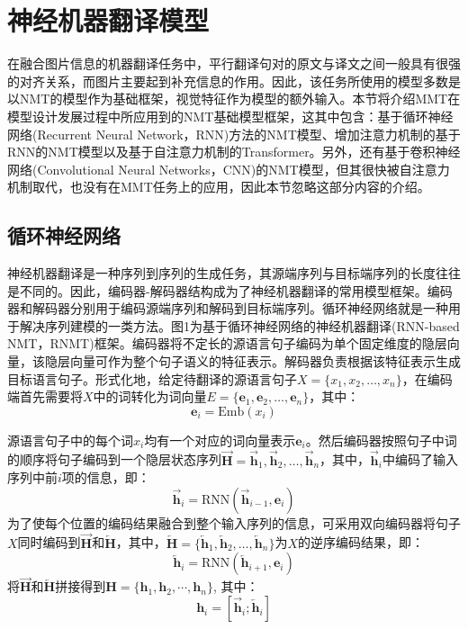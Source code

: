 \section{神经机器翻译模型}
在融合图片信息的机器翻译任务中，平行翻译句对的原文与译文之间一般具有很强的对齐关系，而图片主要起到补充信息的作用。因此，该任务所使用的模型多数是以NMT的模型作为基础框架，视觉特征作为模型的额外输入。本节将介绍MMT在模型设计发展过程中所应用到的NMT基础模型框架，这其中包含：基于循环神经网络(Recurrent Neural Network，RNN)方法的NMT模型、增加注意力机制的基于RNN的NMT模型以及基于自注意力机制的Transformer。另外，还有基于卷积神经网络(Convolutional Neural Networks，CNN)的NMT模型\cite{6_DBLP:journals/corr/GehringAGYD17}，但其很快被自注意力机制取代，也没有在MMT任务上的应用，因此本节忽略这部分内容的介绍。

\subsection{循环神经网络}
神经机器翻译是一种序列到序列的生成任务，其源端序列与目标端序列的长度往往是不同的。因此，编码器-解码器结构成为了神经机器翻译的常用模型框架。编码器和解码器分别用于编码源端序列和解码到目标端序列。循环神经网络就是一种用于解决序列建模的一类方法。图1为基于循环神经网络的神经机器翻译(RNN-based NMT，RNMT)框架。编码器将不定长的源语言句子编码为单个固定维度的隐层向量，该隐层向量可作为整个句子语义的特征表示。解码器负责根据该特征表示生成目标语言句子。形式化地，给定待翻译的源语言句子$X=\{x_1,x_2,…,x_n\}$，在编码端首先需要将$X$中的词转化为词向量$E=\{\boldsymbol{e}_1,\boldsymbol{e}_2,…,\boldsymbol{e}_n\}$，其中：
\begin{equation}
    \boldsymbol{e}_i=\mathrm{Emb}(x_i)
\end{equation}

源语言句子中的每个词$x_i$均有一个对应的词向量表示$\boldsymbol{e}_i$。然后编码器按照句子中词的顺序将句子编码到一个隐层状态序列$\overrightarrow{\boldsymbol{H}}={\overrightarrow{\boldsymbol{h}}_1,\overrightarrow{\boldsymbol{h}}_2,…,\overrightarrow{\boldsymbol{h}}_n}$，其中，$\overrightarrow{\boldsymbol{h}}_i$中编码了输入序列中前$i$项的信息，即：
\begin{equation}
    \overrightarrow{\boldsymbol{h}}_i=\mathrm{RNN}(\overrightarrow{\boldsymbol{h}}_{i-1},\boldsymbol{e}_i)
\end{equation}
为了使每个位置的编码结果融合到整个输入序列的信息，可采用双向编码器将句子$X$同时编码到$\overrightarrow{\boldsymbol{H}}$和$\overleftarrow{\boldsymbol{H}}$，其中，$\overleftarrow{\boldsymbol{H}}=\{\overleftarrow{\boldsymbol{h}}_1,\overleftarrow{\boldsymbol{h}}_2,…,\overleftarrow{\boldsymbol{h}}_n\}$为$X$的逆序编码结果，即：
\begin{equation}
    \overleftarrow{\boldsymbol{h}}_i=\mathrm{RNN}(\overleftarrow{\boldsymbol{h}}_{i+1},\boldsymbol{e}_i)
\end{equation}
将$\overrightarrow{\boldsymbol{H}}$和$\overleftarrow{\boldsymbol{H}}$拼接得到$\boldsymbol{H}=\{\boldsymbol{h}_1,\boldsymbol{h}_2,\cdots,\boldsymbol{h}_n\}$, 其中：
\begin{equation}
    \boldsymbol{h}_i=[\overrightarrow{\boldsymbol{h}}_i;\overleftarrow{\boldsymbol{h}}_i]
\end{equation}

